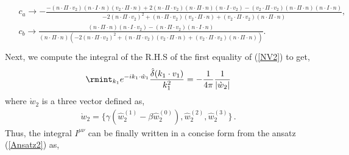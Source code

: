 \begin{align}\begin{split}\label{m:}
  &c_a\to -\frac{-(n\cdot \Pi\cdot v_2) (n\cdot I\cdot n) (v_2\cdot \Pi\cdot n)+2(n\cdot \Pi\cdot v_2)(n\cdot \Pi\cdot n) (n\cdot I\cdot v_2)-(v_2\cdot \Pi\cdot v_2) (n\cdot \Pi\cdot n)(n\cdot I \cdot n)}{-2 (n\cdot \Pi\cdot v_2)^2+(n\cdot \Pi\cdot v_2) (v_2\cdot \Pi\cdot n)+(v_2\cdot \Pi\cdot v_2) (n\cdot \Pi\cdot n)},\\&
 c_b\to \frac{(n\cdot \Pi\cdot n) (n\cdot I\cdot v_2)-(n\cdot \Pi\cdot v_2) (n\cdot I\cdot n)}{(n \cdot \Pi\cdot n) \left(-2 (n\cdot \Pi\cdot v_2)^2+(n\cdot \Pi\cdot v_2) (v_2\cdot \Pi\cdot n)+(v_2\cdot \Pi\cdot v_2) (n\cdot \Pi\cdot n)\right)}.\\
\end{split}
\end{align}
Next, we compute the integral of the R.H.S of the first equality of (\ref{NV2}) to get,
\begin{eqnarray}
\label{CAINT} \rmint_{k_1}e^{-ik_1\cdot \hat w_1}\frac{\hat\delta(k_1\cdot v_1)}{k_1^2} =-\frac{1}{4\pi}\frac{1}{|\grave{w}_2|}
\end{eqnarray}
where $\grave{w}_2$ is a three vector defined as,
\begin{align}
    \grave{w}_2=\Big\{\gamma(\hat{w}_2^{(1)}-\beta \hat{w}_2^{(0)}),\hat{w}_2^{(2)},\hat{w}_2^{(3)}\Big\}\,.
\end{align}
Thus, the integral $I^{\mu\nu}$ can be finally written in a concise form from the ansatz (\ref{Ansatz2}) as,
